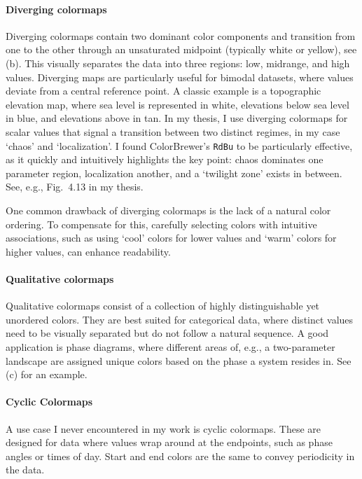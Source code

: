 \paragraph{Diverging colormaps}
Diverging colormaps contain two dominant color components and transition from one to the other through an unsaturated midpoint (typically white or yellow), see (b). This visually separates the data into three regions: low, midrange, and high values. Diverging maps are particularly useful for bimodal datasets, where values deviate from a central reference point. A classic example is a topographic elevation map, where sea level is represented in white, elevations below sea level in blue, and elevations above in tan.
In my thesis, I use diverging colormaps for scalar values that signal a transition between two distinct regimes, in my case `chaos' and `localization'. I found ColorBrewer’s \texttt{RdBu} to be particularly effective, as it quickly and intuitively highlights the key point: chaos dominates one parameter region, localization another, and a `twilight zone' exists in between. See, e.g., Fig.~4.13 in my thesis.

One common drawback of diverging colormaps is the lack of a natural color ordering. To compensate for this, carefully selecting colors with intuitive associations, such as using `cool' colors for lower values and `warm' colors for higher values, can enhance readability.

\paragraph{Qualitative colormaps}
Qualitative colormaps consist of a collection of highly distinguishable yet unordered colors. They are best suited for categorical data, where distinct values need to be visually separated but do not follow a natural sequence. A good application is phase diagrams, where different areas of, e.g., a two-parameter landscape are assigned unique colors based on the phase a system resides in. See (c) for an example.

\paragraph{Cyclic Colormaps}
A use case I never encountered in my work is cyclic colormaps. These are designed for data where values wrap around at the endpoints, such as phase angles or times of day. Start and end colors are the same to convey periodicity in the data.


